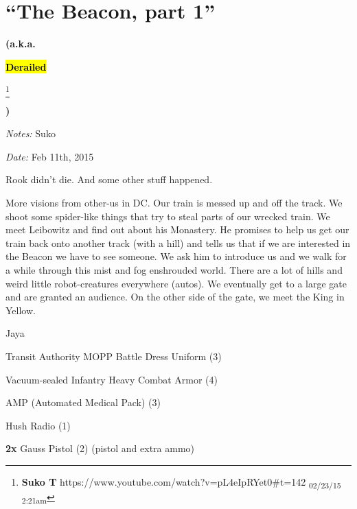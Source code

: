 \setcounter{chapter}{ 39 }
\chapter{\textbf{``The Beacon, part 1''} }




\begin{center}
 {\LARGE \textbf{(a.k.a. } } 
\end{center}
\begin{center}
 {\LARGE \textbf{\hl{Derailed}} } 
\end{center}
\footnote{\textbf{Suko T }https://www.youtube.com/watch?v=pL4eIpRYet0\#t=142 \textsubscript{02/23/15 2:21am}}\begin{center}
 {\LARGE \textbf{)} } 
\end{center}




\textit{Notes:} Suko

\textit{Date:} Feb 11th,  2015



Rook didn't die.  And some other stuff happened.



More visions from other-us in DC.  Our train is messed up and off the track.  We shoot some spider-like things that try to steal parts of our wrecked train.  We meet Leibowitz and find out about his Monastery.  He promises to help us get our train back onto another track (with a hill) and tells us that if we are interested in the Beacon we have to see someone.  We ask him to introduce us and we walk for a while through this mist and fog enshrouded world.  There are a lot of hills and weird little robot-creatures everywhere (autos).  We eventually get to a large gate and are granted an audience. On the other side of the gate, we meet the King in Yellow.





\noindent\hrulefill





Jaya

Transit Authority MOPP Battle Dress Uniform (3)

Vacuum-sealed Infantry Heavy Combat Armor (4) 

AMP (Automated Medical Pack) (3)

Hush Radio (1)

\textbf{2x} Gauss Pistol (2) (pistol and extra ammo)

